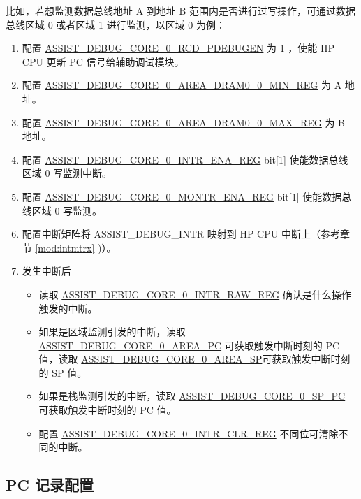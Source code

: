 \documentclass[main\_\_CN.tex]{subfiles}
\begin{document}
 比如，若想监测数据总线地址 A 到地址 B 范围内是否进行过写操作，可通过数据总线区域 0 或者区域 1 进行监测，以区域 0 为例：
\begin{enumerate}
    \item 配置 \hyperref[fielddesc:ASSISTDEBUGCORE0RCDPDEBUGEN]{ASSIST\_DEBUG\_CORE\_0\_RCD\_PDEBUGEN} 为 1 ，使能 HP CPU 更新 PC 信号给辅助调试模块。
    \item 配置 \hyperref[regdesc:ASSISTDEBUGCORE0AREADRAM00MINREG]{ASSIST\_DEBUG\_CORE\_0\_AREA\_DRAM0\_0\_MIN\_REG} 为 A 地址。
    \item 配置 \hyperref[regdesc:ASSISTDEBUGCORE0AREADRAM00MAXREG]{ASSIST\_DEBUG\_CORE\_0\_AREA\_DRAM0\_0\_MAX\_REG} 为 B 地址。
    \item 配置 \hyperref[regdesc:ASSISTDEBUGCORE0INTRENAREG]{ASSIST\_DEBUG\_CORE\_0\_INTR\_ENA\_REG} bit[1] 使能数据总线区域 0 写监测中断。
    \item 配置 \hyperref[regdesc:ASSISTDEBUGCORE0MONTRENAREG]{ASSIST\_DEBUG\_CORE\_0\_MONTR\_ENA\_REG} bit[1] 使能数据总线区域 0 写监测。
    \item 配置中断矩阵将 ASSIST\_DEBUG\_INTR 映射到 HP CPU 中断上（参考章节 \ref{mod:intmtrx} \textit{})）。
    \item 发生中断后
    \begin{itemize}
        \item 读取 \hyperref[regdesc:ASSISTDEBUGCORE0INTRRAWREG]{ASSIST\_DEBUG\_CORE\_0\_INTR\_RAW\_REG} 确认是什么操作触发的中断。
        \item 如果是区域监测引发的中断，读取 \hyperref[fielddesc:ASSISTDEBUGCORE0AREAPC]{ASSIST\_DEBUG\_CORE\_0\_AREA\_PC} 可获取触发中断时刻的 PC 值，读取 \hyperref[fielddesc:ASSISTDEBUGCORE0AREASP]{ASSIST\_DEBUG\_CORE\_0\_AREA\_SP}可获取触发中断时刻的 SP 值。
        \item 如果是栈监测引发的中断，读取 \hyperref[fielddesc:ASSISTDEBUGCORE0SPPC]{ASSIST\_DEBUG\_CORE\_0\_SP\_PC} 可获取触发中断时刻的 PC 值。
        \item 配置 \hyperref[regdesc:ASSISTDEBUGCORE0INTRCLRREG]{ASSIST\_DEBUG\_CORE\_0\_INTR\_CLR\_REG} 不同位可清除不同的中断。
    \end{itemize}

\end{enumerate}


\subsection{PC 记录配置}
\end{document}
